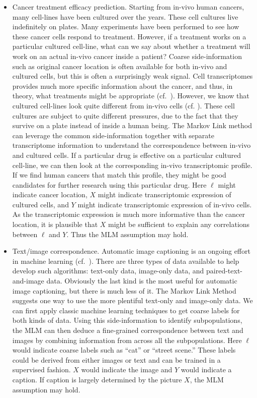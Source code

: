 \begin{itemize}
    \item Cancer treatment efficacy prediction.  Starting from in-vivo human cancers, many cell-lines have been cultured over the years.  These cell cultures live indefinitely on plates.  Many experiments have been performed to see how these cancer cells respond to treatment.  However, if a treatment works on a particular cultured cell-line, what can we say about whether a treatment will work on an actual in-vivo cancer inside a patient?  Coarse side-information such as original cancer location is often available for both in-vivo and cultured cells, but this is often a surprisingly weak signal.  Cell transcriptomes provides much more specific information about the cancer, and thus, in theory, what treatments might be appropriate (cf.\ \cite{cieslik2018cancer}).  However, we know that cultured cell-lines look quite different from in-vivo cells (cf. \cite{imamura2015comparison,haibe2013inconsistency}).   These cell cultures are subject to quite different pressures, due to the fact that they survive on a plate instead of inside a human being.  The Markov Link method can leverage the common side-information together with separate transcriptome information to understand the correspondence between in-vivo and cultured cells.  If a particular drug is effective on a particular cultured cell-line, we can then look at the corresponding in-vivo transcriptomic profile.  If we find human cancers that match this profile, they might be good candidates for further research using this particular drug.  Here $\ell$ might indicate cancer location, $X$ might indicate transcriptomic expression of cultured cells, and $Y$ might indicate transcriptomic expression of in-vivo cells.  As the transcriptomic expression is much more informative than the cancer location, it is plausible that $X$ might be sufficient to explain any correlations between $\ell$ and $Y$.  Thus the MLM assumption may hold.

    \item Text/image correspondence.  Automatic image captioning is an ongoing effort in machine learning (cf.\ \cite{srivastava2018survey}).  There are three types of data available to help develop such algorithms: text-only data, image-only data, and paired-text-and-image data.  Obviously the last kind is the most useful for automatic image captioning, but there is much less of it.  The Markov Link Method suggests one way to use the more plentiful text-only and image-only data.  We can first apply classic machine learning techniques to get coarse labels for both kinds of data.  Using this side-information to identify subpopulations, the MLM can then deduce a fine-grained correspondence between text and images by combining information from across all the subpopulations.  Here $\ell$ would indicate coarse labels such as ``cat'' or ``street scene.''  These labels could be derived from either images or text and can be trained in a supervised fashion.  $X$ would indicate the image and $Y$ would indicate a caption.  If caption is largely determined by the picture $X$, the MLM assumption may hold.  


\end{itemize}

